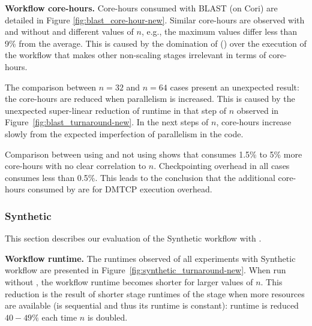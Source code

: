 \noindent\textbf{Workflow core-hours.}
Core-hours consumed with BLAST (on Cori) are detailed in Figure \ref{fig:blast_core-hour-new}. 
Similar core-hours are observed 
with and without \systemname and different values of $n$, e.g., the maximum %
values differ less than 9\% from the average.
This is caused by the domination of (\blastFirst)
over the execution of the workflow that makes other
non-scaling stages irrelevant in terms of core-hours.

The comparison between $n=32$ and $n=64$ 
cases present an unexpected result: the core-hours are reduced
when parallelism is increased.
This is caused by the unexpected super-linear reduction
of runtime in that step of $n$ observed in Figure~\ref{fig:blast_turnaround-new}.
In the next steps of $n$, core-hours increase slowly
from the expected imperfection of parallelism in the code.

Comparison between using and not using \systemname
shows that%
\systemname consumes
1.5\% to 5\% more core-hours with no clear correlation to $n$. 
Checkpointing overhead in all cases consumes
less than 0.5\%.
This leads to the conclusion that
the additional core-hours consumed by \systemname
are for DMTCP execution overhead.





\vspace{-0.25cm}
\subsubsection{Synthetic}
This section describes our evaluation of the Synthetic workflow with \systemname.

\noindent\textbf{Workflow runtime.} 
The runtimes observed of all experiments with Synthetic workflow are presented
in Figure~\ref{fig:synthetic_turnaround-new}.
When run without \systemname, the workflow runtime becomes shorter 
for larger values of $n$.
This reduction is the result of shorter stage runtimes
of the \synSecond stage when more resources 
are available (\synFirst is sequential and thus its
runtime is constant): \synSecond  runtime
is reduced $40-49\%$ each time $n$ is doubled.

